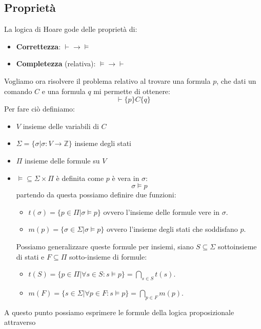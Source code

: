 \subsection{Proprietà}
La logica di Hoare gode delle proprietà di:
\begin{itemize}
    \item \textbf{Correttezza}: $\vdash \to \models$
    \item \textbf{Completezza} (relativa): $\models \to \vdash$
\end{itemize}
Vogliamo ora risolvere il problema relativo al trovare una formula $p$, che dati
un comando $C$ e una formula $q$ mi permette di ottenere: $$\vdash \{p\} C \{q\}$$
Per fare ciò definiamo:
\begin{itemize}
    \item $V$ insieme delle variabili di $C$
    \item $\Sigma = \{\sigma | \sigma: V \to \mathbb{Z} \}$ insieme degli stati
    \item $\Pi$ insieme delle formule su $V$
    \item $\models \subseteq \Sigma \times \Pi$ è definita come $p$ è vera in $\sigma$:
          \begin{equation}
              \sigma \models p
          \end{equation}
          partendo da questa possiamo definire due funzioni:
          \begin{itemize}
              \item $t(\sigma) = \{p \in \Pi | \sigma \models p \}$ ovvero
                    l'insieme delle formule vere in $\sigma$.
              \item $m(p) = \{\sigma \in \Sigma | \sigma \models p \}$ ovvero
                    l'insieme degli stati che soddisfano $p$.
          \end{itemize}
          Possiamo generalizzare queste formule per insiemi, siano $S \subseteq \Sigma$
          sottoinsieme di stati e $F \subseteq \Pi$ sotto-insieme di formule:
          \begin{itemize}
              \item $t(S) = \{p \in \Pi | \forall s \in S: s \models p \} = \bigcap_{s \in S} t(s)$.
              \item $m(F) = \{s \in \Sigma | \forall p \in F: s \models p\} = \bigcap_{p \in F} m(p)$.
          \end{itemize}
\end{itemize}
A questo punto possiamo esprimere le formule della logica proposizionale attraverso
